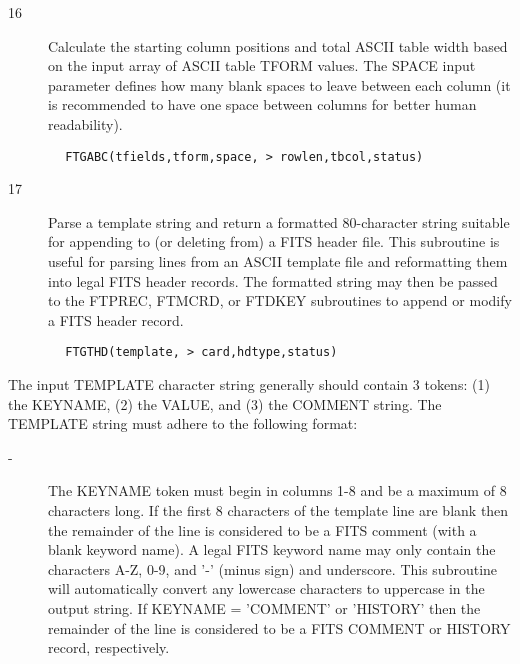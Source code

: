 \documentclass[11pt]{book}
\begin{document}
\begin{description}
\item[16] Calculate the starting column positions and total ASCII table width
    based on the input array of ASCII table TFORM values.  The SPACE input
    parameter defines how many blank spaces to leave between each column
    (it is recommended to have one space between columns for better human
   readability).
\end{description}

\begin{verbatim}
        FTGABC(tfields,tform,space, > rowlen,tbcol,status)
\end{verbatim}

\begin{description}
\item[17] Parse a template string and return a formatted 80-character string
    suitable for appending to (or deleting from) a FITS header file.
    This subroutine is useful for parsing lines from an ASCII template file
    and reformatting them into legal FITS header records.  The formatted
    string may then be passed to the FTPREC, FTMCRD, or FTDKEY subroutines
   to append or modify a FITS header record.
\end{description}

\begin{verbatim}
        FTGTHD(template, > card,hdtype,status)
\end{verbatim}
    The input TEMPLATE character string generally should contain 3 tokens:
    (1) the KEYNAME, (2) the VALUE, and (3) the COMMENT string.  The
    TEMPLATE string must adhere to the following format:


\begin{description}
\item[- ]     The KEYNAME token must begin in columns 1-8 and be a maximum  of 8
        characters long.  If the first 8 characters of the template line are
        blank then the remainder of the line is considered to be a FITS comment
        (with a blank keyword name).  A legal FITS keyword name may only
        contain the characters A-Z, 0-9, and '-' (minus sign) and
        underscore.  This subroutine will automatically convert any lowercase
        characters to uppercase in the output string.  If KEYNAME = 'COMMENT'
        or 'HISTORY' then the remainder of the line is considered to be a FITS
       COMMENT or HISTORY record, respectively.
\end{description}
\end{document}
